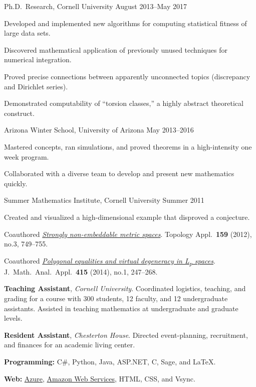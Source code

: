 \documentclass[11pt, letterpaper]{awesome-cv}
\begin{document}

\begin{cventries}

\cventry
	{Ph.D.~Research, Cornell University}
	{}{}
	{August 2013--May 2017}
	{
		\begin{cvitems}
			\item{Developed and implemented new algorithms for computing statistical fitness of large data sets.}
			\item{Discovered mathematical application of previously unused techniques for numerical integration.}
			\item{Proved precise connections between apparently unconnected topics (discrepancy and Dirichlet series).}
			\item{Demonstrated computability of ``torsion classes,'' a highly abstract theoretical construct.}
		\end{cvitems}
	}
		
\cventry
	{Arizona Winter School, University of Arizona}
	{}{}
	{May 2013--2016}
	{
		\begin{cvitems}
			\item{Mastered concepts, ran simulations, and proved theorems in a high-intensity one week program.}
			\item{Collaborated with a diverse team to develop and present new mathematics quickly.}
		\end{cvitems}
	}
	
\cventry
	{Summer Mathematics Institute, Cornell University}
	{}{}
	{Summer 2011}
	{
		\begin{cvitems}
			\item{Created and visualized a high-dimensional example that disproved a conjecture.}
			\item{Coauthored \href{http://dx.doi.org/10.1016/j.topol.2011.11.041}{\emph{Strongly non-embeddable metric spaces}}. Topology Appl.~\textbf{159} (2012), no.3, 749--755.}
			\item{Coauthored \href{http://dx.doi.org/10.1016/j.jmaa.2014.01.063}{\emph{Polygonal equalities and virtual degeneracy in L\textsubscript{p} spaces}}. J.~Math.~Anal.~Appl.~\textbf{415} (2014), no.1, 247--268.}
		\end{cvitems}
	}
\end{cventries}






\begin{cvparagraph}
\textbf{Teaching Assistant}, \emph{Cornell University}. Coordinated logistics, teaching, and grading for a course with 300 students, 12 faculty, and 12 undergraduate assistants.
Assisted in teaching mathematics at undergraduate and graduate levels.

\textbf{Resident Assistant}, \emph{Chesterton House}. Directed event-planning, recruitment, and finances for an academic living center. 
\end{cvparagraph}






\begin{cvparagraph}
\textbf{Programming:} C\#, Python, Java, ASP.NET, C, Sage, and \LaTeX.

\textbf{Web:} \href{https://azure.microsoft.com/}{Azure}, \href{https://aws.amazon.com/}{Amazon Web Services}, HTML, CSS, and Vsync.
\end{cvparagraph}
\end{document}
